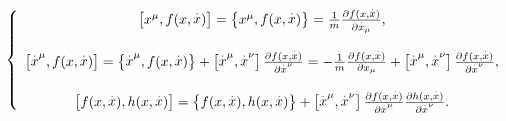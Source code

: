 \begin{equation}
\left\{ 
\begin{array}{c}
\left[ x^{\mu },f(x,\stackrel{.}{x})\right] =\left\{ x^{\mu },f(x,\stackrel{.%
}{x})\right\} =\frac{1}{m}\frac{\partial f(x,\stackrel{.}{x})}{\partial 
\stackrel{.}{x}_{\mu }}, \\ 
\\ 
\left[ \stackrel{.}{x}^{\mu },f(x,\stackrel{.}{x})\right] =\left\{ \stackrel{%
.}{x}^{\mu },f(x,\stackrel{.}{x})\right\} +\left[ \stackrel{.}{x}^{\mu },%
\stackrel{.}{x}^{\nu }\right] \frac{\partial f(x,\stackrel{.}{x})}{\partial 
\stackrel{.}{x}^{\nu }}=-\frac{1}{m}\frac{\partial f(x,\stackrel{.}{x})}{%
\partial x_{\mu }}+\left[ \stackrel{.}{x}^{\mu },\stackrel{.}{x}^{\nu
}\right] \frac{\partial f(x,\stackrel{.}{x})}{\partial \stackrel{.}{x}^{\nu }%
}, \\ 
\\ 
\left[ f(x,\stackrel{.}{x}),h(x,\stackrel{.}{x})\right] =\left\{ f(x,%
\stackrel{.}{x}),h(x,\stackrel{.}{x})\right\} +\left[ \stackrel{.}{x}^{\mu },%
\stackrel{.}{x}^{\nu }\right] \frac{\partial f(x,\stackrel{.}{x})}{\partial 
\stackrel{.}{x}^{\mu }}\frac{\partial h(x,\stackrel{.}{x})}{\partial 
\stackrel{.}{x}^{\nu }}.
\end{array}
\right.
\end{equation}

